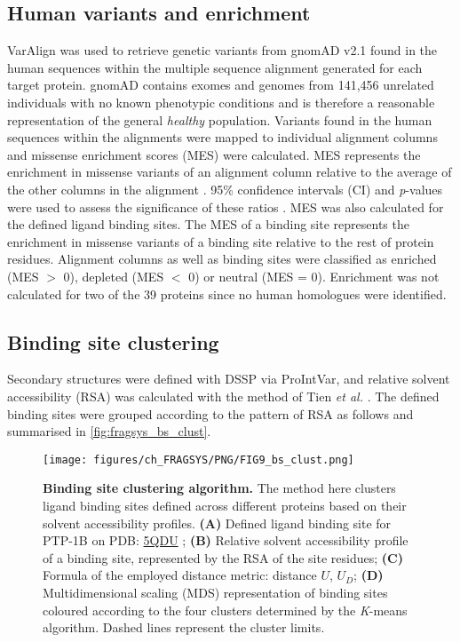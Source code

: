 \subsection{Human variants and enrichment}

VarAlign \cite{MACGOWAN_2020_DRSASP} was used to retrieve genetic variants from gnomAD v2.1 \cite{KARCZEWSKI_2020_GNOMAD} found in the human sequences within the multiple sequence alignment generated for each target protein. gnomAD contains exomes and genomes from 141,456 unrelated individuals with no known phenotypic conditions and is therefore a reasonable representation of the general \textit{healthy} population. Variants found in the human sequences within the alignments were mapped to individual alignment columns and missense enrichment scores (MES) were calculated. MES represents the enrichment in missense variants of an alignment column relative to the average of the other columns in the alignment \cite{MACGOWAN_2017_VARIANTS, MACGOWAN_2024_VARIANTS}. 95\% confidence intervals (CI) and \textit{p}-values were used to assess the significance of these ratios \cite{SZUMILAS_2010_ODDSRATIOS}. MES was also calculated for the defined ligand binding sites. The MES of a binding site represents the enrichment in missense variants of a binding site relative to the rest of protein residues. Alignment columns as well as binding sites were classified as enriched (MES $>$ 0), depleted (MES $<$ 0) or neutral (MES = 0). Enrichment was not calculated for two of the 39 proteins since no human homologues were identified.

\subsection{Binding site clustering}

Secondary structures were defined with DSSP \cite{KABSCH_1983_DSSP} via ProIntVar, and relative solvent accessibility (RSA) was calculated with the method of Tien \textit{et al.} \cite{TIEN_2013_RSA}. The defined binding sites were grouped according to the pattern of RSA as follows and summarised in \autoref{fig:fragsys_bs_clust}.

\begin{figure}[htb!]
    \centering
    \texttt{[image: figures/ch\_FRAGSYS/PNG/FIG9\_bs\_clust.png]}
    \caption[Binding site clustering algorithm]{\textbf{Binding site clustering algorithm.} The method here clusters ligand binding sites defined across different proteins based on their solvent accessibility profiles. \textbf{(A)} Defined ligand binding site for PTP-1B on PDB: \href{https://www.ebi.ac.uk/pdbe/entry/pdb/5qdu}{5QDU} \cite{KEEDY_2018_PTP1B}; \textbf{(B)} Relative solvent accessibility profile of a binding site, represented by the RSA of the site residues; \textbf{(C)} Formula of the employed distance metric: distance $U$, $U_{D}$; \textbf{(D)} Multidimensional scaling (MDS) representation of binding sites coloured according to the four clusters determined by the \textit{K}-means algorithm. Dashed lines represent the cluster limits.}
    \label{fig:fragsys_bs_clust}
\end{figure}

